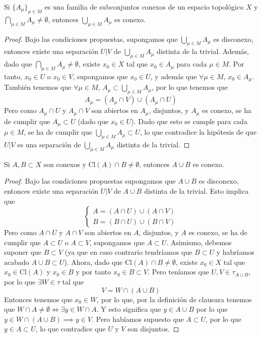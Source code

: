 \begin{proposición}
    Si $\{A_\mu\}_{\mu \in M}$ es una familia de subconjuntos conexos de un espacio topológico $X$ y $\bigcap_{\mu \in M} A_\mu \neq \emptyset$, entonces $\bigcup_{\mu \in M} A_\mu$ es conexo.
\end{proposición}
\begin{proof}
    Bajo las condiciones propuestas, supongamos que $\bigcup_{\mu \in M} A_\mu$ es disconexo, entonces existe una separación $U|V$ de $\bigcup_{\mu \in M} A_\mu$ distinta de la trivial. Además, dado que $\bigcap_{\mu \in M} A_\mu \neq \emptyset$, existe $x_0 \in X$ tal que $x_0 \in A_\mu$ para cada $\mu \in M$. Por tanto, $x_0 \in U$ o $x_0 \in V$, supongamos que $x_0 \in U$, y además que $\forall \mu \in M$, $x_0 \in A_\mu$. \\
    También tenemos que $\forall \mu \in M$, $A_{\mu} \subset \bigcup_{\mu \in M} A_\mu$, por lo que tenemos que 
    $$A_{\mu} = (A_{\mu} \cap V) \cup (A_{\mu} \cap U)$$
    Pero como $A_{\mu} \cap U$ y $A_{\mu} \cap V$ son abiertos en $A_{\mu}$, disjuntos, y $A_{\mu}$ es conexo, se ha de cumplir que $A_{\mu} \subset U$ (dado que $x_0 \in U$). Dado que esto se cumple para cada $\mu \in M$, se ha de cumplir que $\bigcup_{\mu \in M} A_\mu \subset U$, lo que contradice la hipótesis de que $U|V$ es una separación de $\bigcup_{\mu \in M} A_\mu$ distinta de la trivial.
\end{proof}
\begin{proposición}
    Si $A, B \subset X$ son conexos y $\mathrm{Cl}(A) \cap B \neq \emptyset$, entonces $A \cup B$ es conexo.
\end{proposición}
\begin{proof}
    Bajo las condiciones propuestas supongamos que $A \cup B$ es disconexo, entonces existe una separación $U|V$ de $A \cup B$ distinta de la trivial. Esto implica que
    $$\begin{cases} A = (A \cap U) \cup (A \cap V) \\ B = (B \cap U) \cup (B \cap V) \end{cases}$$
    Pero como $A \cap U$ y $A \cap V$ son abiertos en $A$, disjuntos, y $A$ es conexo, se ha de cumplir que $A \subset U$ o $A \subset V$, supongamos que $A \subset U$. Asimismo, debemos suponer que $B \subset V$ (ya que en caso contrario tendríamos que $B \subset U$ y habríamos acabado $A \cup B \subset U$). Ahora, dado que $\mathrm{Cl}(A) \cap B \neq \emptyset$, existe $x_0 \in X$ tal que $x_0 \in \mathrm{Cl}(A)$ y $x_0 \in B$ y por tanto $x_0 \in B \subset V$. Pero teníamos que $U, V \in \tau_{A \cup B}$, por lo que $\exists W \in \tau$ tal que
    $$V = W \cap (A \cup B)$$
    Entonces tenemos que $x_0 \in W$, por lo que, por la definición de clausura tenemos que $W \cap A \neq \emptyset \iff \exists y \in W \cap A$. Y esto significa que $y \in A \cup B$ por lo que $y \in W \cap (A \cup B) \implies y \in V$. Pero habíamos supuesto que $A \subset U$, por lo que $y \in A \subset U$, lo que contradice que $U$ y $V$ son disjuntos.
\end{proof}
